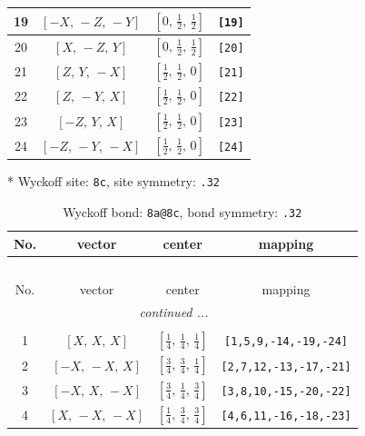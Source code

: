 \documentclass[fleqn,8pt]{jsarticle}
\begin{document}
\begin{longtable}{cccc}
19 & $\left[ - X,\, - Z,\, - Y \right]$ & $\left[ 0,\, \frac{1}{2},\, \frac{1}{2} \right]$ & {\tt [19]} \\ \hline
20 & $\left[ X,\, - Z,\, Y \right]$ & $\left[ 0,\, \frac{1}{2},\, \frac{1}{2} \right]$ & {\tt [20]} \\ \hline
21 & $\left[ Z,\, Y,\, - X \right]$ & $\left[ \frac{1}{2},\, \frac{1}{2},\, 0 \right]$ & {\tt [21]} \\ \hline
22 & $\left[ Z,\, - Y,\, X \right]$ & $\left[ \frac{1}{2},\, \frac{1}{2},\, 0 \right]$ & {\tt [22]} \\ \hline
23 & $\left[ - Z,\, Y,\, X \right]$ & $\left[ \frac{1}{2},\, \frac{1}{2},\, 0 \right]$ & {\tt [23]} \\ \hline
24 & $\left[ - Z,\, - Y,\, - X \right]$ & $\left[ \frac{1}{2},\, \frac{1}{2},\, 0 \right]$ & {\tt [24]} \\
\end{longtable}
* Wyckoff site: {\tt 8c}, site symmetry: {\tt .32}
\renewcommand{\arraystretch}{1.2}
\begin{longtable}{cccc}
\caption{Wyckoff bond: {\tt 8a@8c}, bond symmetry: {\tt .32}}
 \\
 \hline \hline
No. & vector & center & mapping \\ \hline \endfirsthead

\multicolumn{3}{l}{\tablename\ \thetable{}} \\
 \hline \hline
No. & vector & center & mapping \\ \hline \endhead

 \hline \hline
\multicolumn{3}{r}{\footnotesize\it continued ...} \\ \endfoot

 \hline \hline
\multicolumn{3}{r}{} \\ \endlastfoot

1 & $\left[ X,\, X,\, X \right]$ & $\left[ \frac{1}{4},\, \frac{1}{4},\, \frac{1}{4} \right]$ & {\tt [1,5,9,-14,-19,-24]} \\ \hline
2 & $\left[ - X,\, - X,\, X \right]$ & $\left[ \frac{3}{4},\, \frac{3}{4},\, \frac{1}{4} \right]$ & {\tt [2,7,12,-13,-17,-21]} \\ \hline
3 & $\left[ - X,\, X,\, - X \right]$ & $\left[ \frac{3}{4},\, \frac{1}{4},\, \frac{3}{4} \right]$ & {\tt [3,8,10,-15,-20,-22]} \\ \hline
4 & $\left[ X,\, - X,\, - X \right]$ & $\left[ \frac{1}{4},\, \frac{3}{4},\, \frac{3}{4} \right]$ & {\tt [4,6,11,-16,-18,-23]} \\
\end{longtable}
\end{document}

